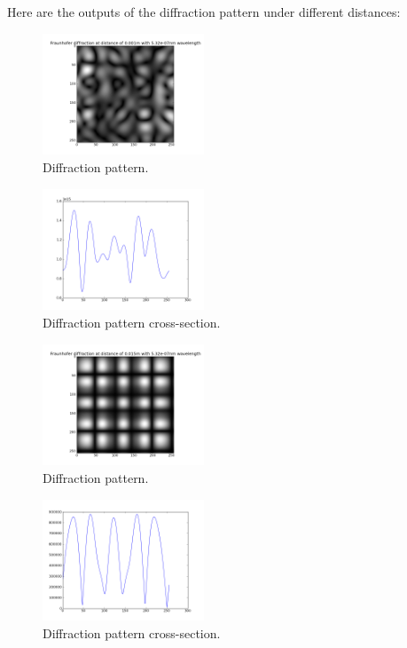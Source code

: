 \documentclass[journal,9pt]{IEEEtran}
\begin{document}
Here are the outputs of the diffraction pattern under different distances:

\begin{figure}[H]
\centering
\includegraphics[width=1.9in]{q2d1mm}
\caption{Diffraction pattern.}
\label{fig:q2d1mm}
\end{figure}

\begin{figure}[H]
\centering
\includegraphics[width=1.9in]{q2s1mm}
\caption{Diffraction pattern cross-section.}
\label{fig:q2s1mm}
\end{figure}

\begin{figure}[H]
\centering
\includegraphics[width=1.9in]{q2d15mm}
\caption{Diffraction pattern.}
\label{fig:q2d15mm}
\end{figure}

\begin{figure}[H]
\centering
\includegraphics[width=1.9in]{q2s15mm}
\caption{Diffraction pattern cross-section.}
\label{fig:q2s15mm}
\end{figure}
\end{document}
